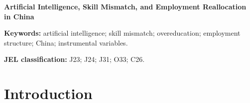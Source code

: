 \documentclass[12pt,a4paper]{article}
\theoremstyle{predstyle}
\theoremstyle{plain}
\begin{document}
\begin{center}
{\large\bfseries Artificial Intelligence, Skill Mismatch, and Employment Reallocation in China\par}
\end{center}

\begin{abstract}
This paper asks whether firm-level AI adoption creates inclusive employment gains in China and how pre-existing skill mismatch shapes the answer. Using annual-report text measures for Chinese A-share listed firms from 2010 to 2022, I instrument overeducation and its interaction with AI using an education-expansion shift-share design, treating AI adoption itself as conditionally exogenous; a Broadband China difference-in-differences provides complementary validation. AI adoption raises total employment (IV coefficient: 0.574) and increases the high-skilled labor share by 0.109, while reducing the low-skilled share by 0.150. Overeducation weakens AI's complementarity with high-skilled labor but buffers low-skilled workers from displacement. Within the task-based framework, these employment shifts are consistent with a widening skill wage premium; pay dispersion data provide suggestive evidence: AI adoption widens the within-firm executive-to-worker compensation gap, an effect that overeducation compresses. Credential-task alignment, industry mismatch, and local institutions together determine whether AI adoption widens or contains inequality in labor-market outcomes.
\end{abstract}

\noindent\textbf{Keywords:} artificial intelligence; skill mismatch; overeducation; employment structure; China; instrumental variables.

\noindent\textbf{JEL classification:} J23; J24; J31; O33; C26.

\vspace{0.5em}

\section{Introduction}
\label{sec:intro}
\end{document}
